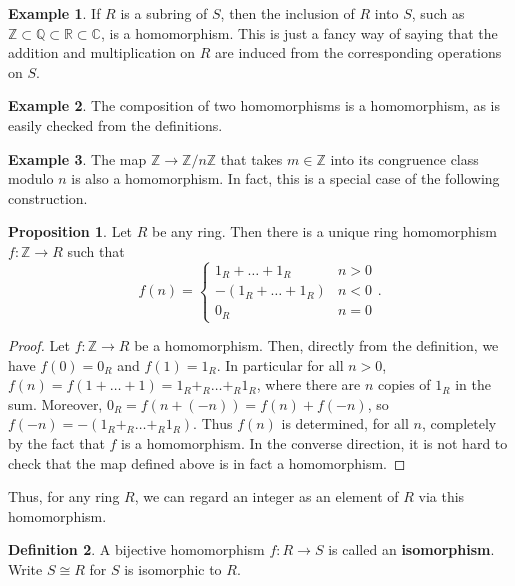 \documentclass{article}
\newcommand{\Z}{\mathbb{Z}}
\newcommand{\Q}{\mathbb{Q}}
\newcommand{\R}{\mathbb{R}}
\newcommand{\C}{\mathbb{C}}
\newcommand{\rb}[1]{\left( #1 \right)}
\theoremstyle{definition}\newtheorem{definition}{Definition}[subsection]
\theoremstyle{definition}\newtheorem{remark}[definition]{Remark}
\theoremstyle{definition}\newtheorem*{example}{Example}
\theoremstyle{definition}\newtheorem*{note}{Note}
\newtheorem{proposition}[definition]{Proposition}
\begin{document}
\begin{example}
If $ R $ is a subring of $ S $, then the inclusion of $ R $ into $ S $, such as $ \Z \subset \Q \subset \R \subset \C $, is a homomorphism. This is just a fancy way of saying that the addition and multiplication on $ R $ are induced from the corresponding operations on $ S $.
\end{example}

\begin{example}
The composition of two homomorphisms is a homomorphism, as is easily checked from the definitions.
\end{example}

\begin{example}
The map $ \Z \to \Z / n\Z $ that takes $ m \in \Z $ into its congruence class modulo $ n $ is also a homomorphism. In fact, this is a special case of the following construction.
\end{example}

\begin{proposition}
Let $ R $ be any ring. Then there is a unique ring homomorphism $ f : \Z \to R $ such that
$$ f\rb{n} = \begin{cases} 1_R + \dots + 1_R & n > 0 \\ -\rb{1_R + \dots + 1_R} & n < 0 \\ 0_R & n = 0 \end{cases}. $$
\end{proposition}

\begin{proof}
Let $ f : \Z \to R $ be a homomorphism. Then, directly from the definition, we have $ f\rb{0} = 0_R $ and $ f\rb{1} = 1_R $. In particular for all $ n > 0 $, $ f\rb{n} = f\rb{1 + \dots + 1} = 1_R +_R \dots +_R 1_R $, where there are $ n $ copies of $ 1_R $ in the sum. Moreover, $ 0_R = f\rb{n + \rb{-n}} = f\rb{n} + f\rb{-n} $, so $ f\rb{-n} = -\rb{1_R +_R \dots +_R 1_R} $. Thus $ f\rb{n} $ is determined, for all $ n $, completely by the fact that $ f $ is a homomorphism. In the converse direction, it is not hard to check that the map defined above is in fact a homomorphism.
\end{proof}

Thus, for any ring $ R $, we can regard an integer as an element of $ R $ via this homomorphism.

\begin{definition}
A bijective homomorphism $ f : R \to S $ is called an \textbf{isomorphism}. Write $ S \cong R $ for $ S $ is isomorphic to $ R $.
\end{definition}
\end{document}
